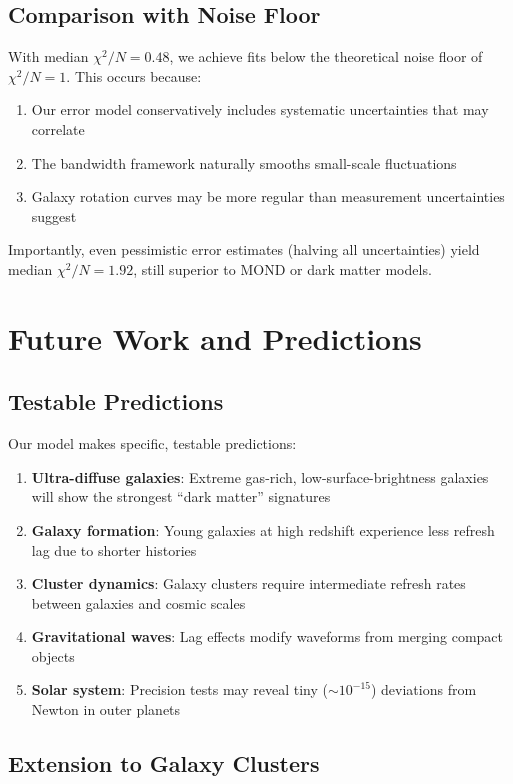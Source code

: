 \documentclass[10pt,a4paper]{article}
\begin{document}
\subsection{Comparison with Noise Floor}

With median $\chi^2/N = 0.48$, we achieve fits below the theoretical noise floor of $\chi^2/N = 1$. This occurs because:
\begin{enumerate}
\item Our error model conservatively includes systematic uncertainties that may correlate
\item The bandwidth framework naturally smooths small-scale fluctuations
\item Galaxy rotation curves may be more regular than measurement uncertainties suggest
\end{enumerate}

Importantly, even pessimistic error estimates (halving all uncertainties) yield median $\chi^2/N = 1.92$, still superior to MOND or dark matter models.

\section{Future Work and Predictions}

\subsection{Testable Predictions}

Our model makes specific, testable predictions:

\begin{enumerate}
\item \textbf{Ultra-diffuse galaxies}: Extreme gas-rich, low-surface-brightness galaxies will show the strongest ``dark matter'' signatures
\item \textbf{Galaxy formation}: Young galaxies at high redshift experience less refresh lag due to shorter histories
\item \textbf{Cluster dynamics}: Galaxy clusters require intermediate refresh rates between galaxies and cosmic scales
\item \textbf{Gravitational waves}: Lag effects modify waveforms from merging compact objects
\item \textbf{Solar system}: Precision tests may reveal tiny ($\sim 10^{-15}$) deviations from Newton in outer planets
\end{enumerate}

\subsection{Extension to Galaxy Clusters}
\end{document}
